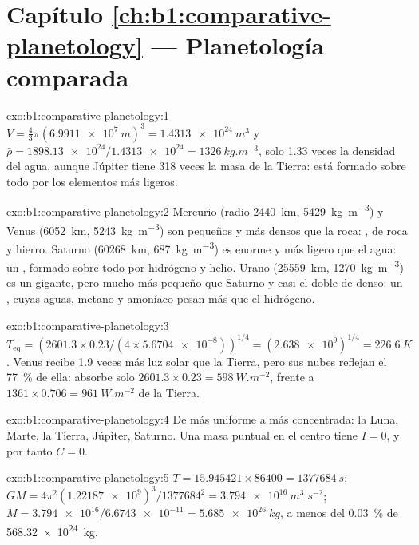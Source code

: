 \section*{Capítulo \ref{ch:b1:comparative-planetology} --- Planetología comparada}

\begin{solution}{exo:b1:comparative-planetology:1}
$V = \tfrac43\pi(\qty{6.9911e7}{m})^3 = \qty{1.4313e24}{m^3}$ y
$\bar\rho = \num{1898.13e24}/\num{1.4313e24} = \qty{1326}{kg.m^{-3}}$, solo 1.33 veces la
densidad del agua, aunque Júpiter tiene 318 veces la masa de la Tierra: está formado sobre todo
por los elementos más ligeros.
\end{solution}

\begin{solution}{exo:b1:comparative-planetology:2}
Mercurio (radio \qty{2440}{km}, \qty{5429}{kg.m^{-3}}) y Venus (\qty{6052}{km},
\qty{5243}{kg.m^{-3}}) son pequeños y más densos que la roca: , de roca y
hierro. Saturno (\qty{60268}{km}, \qty{687}{kg.m^{-3}}) es enorme y más ligero que el agua: un
, formado sobre todo por hidrógeno y helio. Urano (\qty{25559}{km},
\qty{1270}{kg.m^{-3}}) es un gigante, pero mucho más pequeño que Saturno y casi el doble de
denso: un , cuyas aguas, metano y amoníaco pesan más que el hidrógeno.
\end{solution}

\begin{solution}{exo:b1:comparative-planetology:3}
$T_\mathrm{eq} = (2601.3\times0.23/(4\times\num{5.6704e-8}))^{1/4} =
(\num{2.638e9})^{1/4} = \qty{226.6}{K}$. Venus recibe 1.9 veces más luz solar que la Tierra,
pero sus nubes reflejan el \qty{77}{\percent} de ella: absorbe solo $2601.3\times0.23 = \qty{598}{W.m^{-2}}$, frente a $1361\times0.706 = \qty{961}{W.m^{-2}}$ de la Tierra.
\end{solution}

\begin{solution}{exo:b1:comparative-planetology:4}
De más uniforme a más concentrada: la Luna, Marte, la Tierra, Júpiter, Saturno. Una masa
puntual en el centro tiene $I = 0$, y por tanto $C = 0$.
\end{solution}

\begin{solution}{exo:b1:comparative-planetology:5}
$T = 15.945421\times86400 = \qty{1377684}{s}$;
$GM = 4\pi^2(\num{1.22187e9})^3/\num{1377684}^2 = \qty{3.794e16}{m^3.s^{-2}}$;
$M = \num{3.794e16}/\num{6.6743e-11} = \qty{5.685e26}{kg}$, a menos del
\qty{0.03}{\percent} de \qty{568.32e24}{kg}.
\end{solution}

